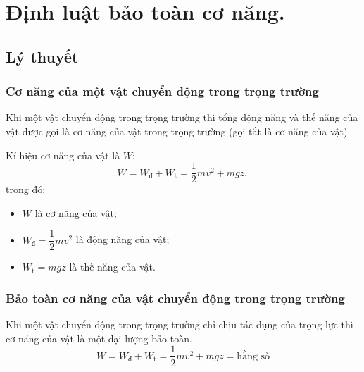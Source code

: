 \let\lesson\undefined
\newcommand{\lesson}{\phantomlesson{Bài 17: Động năng và thế năng. Định luật bảo toàn cơ năng.}}
\chapter[Định luật bảo toàn cơ năng.]{Định luật bảo toàn cơ năng.}
\setcounter{section}{0}
\section{Lý thuyết}
\subsection{Cơ năng của một vật chuyển động trong trọng trường}
Khi một vật chuyển động trong trọng trường thì tổng động năng và thế năng của vật được gọi là cơ năng của vật trong trọng trường (gọi tắt là cơ năng của vật).

Kí hiệu cơ năng của vật là $W$:
\begin{equation*}
	W=W_\text{đ}+W_\text{t}=\dfrac{1}{2}mv^2+mgz\label{CT-conang},
\end{equation*}
trong đó:
\begin{itemize}
	\item $W$ là cơ năng của vật;
	\item $W_\text{đ}=\dfrac{1}{2}mv^2$ là động năng của vật;
	\item $W_\text{t}=mgz$ là thế năng của vật.
\end{itemize}

\subsection{Bảo toàn cơ năng của vật chuyển động trong trọng trường}
Khi một vật chuyển động trong trọng trường chỉ chịu tác dụng của trọng lực thì cơ năng của vật là một đại lượng bảo toàn.
\begin{equation*}
	W=W_\text{đ}+W_\text{t}=\dfrac{1}{2}mv^2+mgz=\textrm{hằng số}
\end{equation*}

